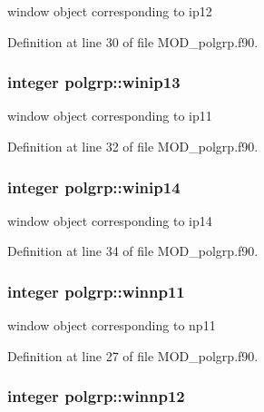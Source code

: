 window object corresponding to ip12 



Definition at line 30 of file M\-O\-D\-\_\-polgrp.\-f90.

\hypertarget{classpolgrp_a335848d07bb9d569d26707648ede83e1}{
\subsubsection[{winip13}]{\setlength{\rightskip}{0pt plus 5cm}integer polgrp\-::winip13}}\label{classpolgrp_a335848d07bb9d569d26707648ede83e1}


window object corresponding to ip11 



Definition at line 32 of file M\-O\-D\-\_\-polgrp.\-f90.

\hypertarget{classpolgrp_a809358dbcbadb21641441612c9ab8672}{
\subsubsection[{winip14}]{\setlength{\rightskip}{0pt plus 5cm}integer polgrp\-::winip14}}\label{classpolgrp_a809358dbcbadb21641441612c9ab8672}


window object corresponding to ip14 



Definition at line 34 of file M\-O\-D\-\_\-polgrp.\-f90.

\hypertarget{classpolgrp_ad301759501dd29ae3dd0d1808b9e667e}{
\subsubsection[{winnp11}]{\setlength{\rightskip}{0pt plus 5cm}integer polgrp\-::winnp11}}\label{classpolgrp_ad301759501dd29ae3dd0d1808b9e667e}


window object corresponding to np11 



Definition at line 27 of file M\-O\-D\-\_\-polgrp.\-f90.

\hypertarget{classpolgrp_a37cb2c122436bd12b40dc41522d0ca6b}{
\subsubsection[{winnp12}]{\setlength{\rightskip}{0pt plus 5cm}integer polgrp\-::winnp12}}\label{classpolgrp_a37cb2c122436bd12b40dc41522d0ca6b}


